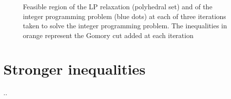 \begin{figure}[h]
      \caption{Feasible region of the LP relaxation (polyhedral set) and of the integer programming problem (blue dots) at each of three iterations taken to solve the integer programming problem. The inequalities in orange represent the Gomory cut added at each iteration} \label{p1c10:fig:LP_1}	
\end{figure}


\section{Stronger inequalities}

..
 



 



